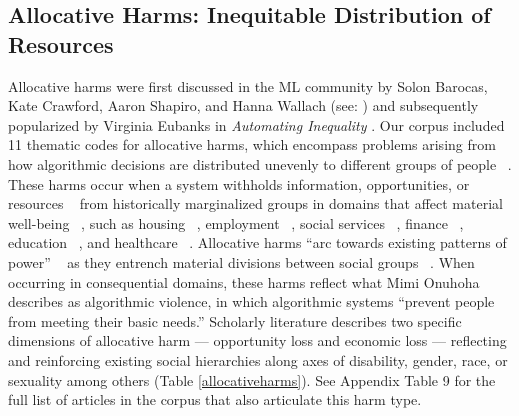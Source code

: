 \subsection{Allocative Harms: Inequitable Distribution of Resources}
Allocative harms were first discussed in the ML community by Solon Barocas, Kate Crawford, Aaron Shapiro, and Hanna Wallach (see: \cite{barocas2017problem, Crawford_2017}) and subsequently popularized by Virginia Eubanks in \textit{Automating Inequality} \cite{Eubanks_2018}. Our corpus included 11 thematic codes for allocative harms, which encompass problems arising from how algorithmic decisions are distributed unevenly to different groups of people ~\cite{barocas-hardt-narayanan, Richardson_Gilbert_2021}. These harms occur when a system withholds information, opportunities, or resources ~\cite{barocas-hardt-narayanan} from historically marginalized groups in domains that affect material well-being ~\cite{Microsoft_2022}, such as housing ~\cite{Jane_2018}, employment ~\cite{Singh_Joachims_2018}, social services ~\cite{Bailey_Burkell_Dunn_Gosse_Steeves_2021, Singh_Joachims_2018}, finance ~\cite{Kapania_Siy_Clapper_Sp_Sambasivan_2022}, education ~\cite{Karumbaiah_Brooks_2021}, and healthcare ~\cite{Obermeyer_2019}. Allocative harms “arc towards existing patterns of power” ~\cite[p. 2]{Davis_Williams_Yang_2021} as they entrench material divisions between social groups ~\cite{Zajko_2022}. When occurring in consequential domains, these harms reflect what Mimi Onuhoha ~\cite[n.p.]{Onuhoha} describes as algorithmic violence, in which algorithmic systems “prevent people from meeting their basic needs.” Scholarly literature describes two specific dimensions of allocative harm — opportunity loss and economic loss — reflecting and reinforcing existing social hierarchies along axes of disability, gender, race, or sexuality among others (Table \ref{allocativeharms}). See Appendix Table 9 for the full list of articles in the corpus that also articulate this harm type.

